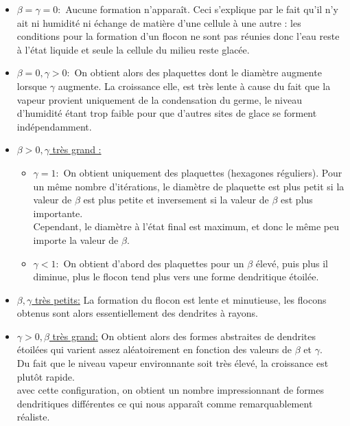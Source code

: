 \documentclass[a4paper,12pt,twoside]{report}
\begin{document}
\begin{itemize}[label=\textbullet]
	\item \underline{$\beta=\gamma=0:$} Aucune formation n’apparaît. Ceci s’explique par 		le fait qu’il n’y ait ni humidité ni échange de matière d’une cellule à une autre : 		les conditions pour la formation d’un flocon ne sont pas réunies donc l’eau reste à 		l’état liquide et seule la cellule du milieu reste glacée.
	\medbreak
	\item \underline{$\beta=0, \gamma>0:$} On obtient alors des plaquettes dont le 				diamètre augmente lorsque $\gamma$ augmente. La croissance elle, est très lente à 			cause du fait que la vapeur provient uniquement de la condensation du germe, le niveau 	d'humidité étant trop faible pour que d'autres sites de glace se forment 					indépendamment.
	\medbreak
	\item \underline{$\beta>0, \gamma$ très grand :}
	\medbreak
		\begin{itemize}[label=$\square$]
		\item \underline{$\gamma=1:$} On obtient uniquement des plaquettes (hexagones 				réguliers). Pour un même nombre d’itérations, le diamètre de plaquette est plus 			petit si la valeur de $\beta$ est plus petite et inversement si la valeur de 
		$\beta$ est plus importante.\\Cependant, le diamètre à l’état final est maximum,
		et donc le même peu importe la valeur de $\beta$. 
		\item \underline{$\gamma<1:$} On obtient d’abord des plaquettes pour un $\beta$
		élevé, puis plus il diminue, plus le flocon tend plus vers une forme dendritique
		étoilée.
		\end{itemize}
	\item \underline{$\beta, \gamma$ très petits:} La formation du flocon est lente et
	minutieuse, les flocons obtenus sont alors essentiellement des dendrites à rayons.
	\item \underline{$\gamma>0, \beta$ très grand:} On obtient alors des formes abstraites
	de dendrites étoilées qui varient assez aléatoirement en fonction des valeurs de 
	$\beta$ et $\gamma$.\\Du fait que le niveau vapeur environnante soit très élevé, la
	croissance est plutôt rapide.\\avec cette configuration, on obtient un nombre 				impressionnant de formes dendritiques différentes ce qui nous apparaît comme
	remarquablement réaliste.
\end{itemize}
\end{document}
